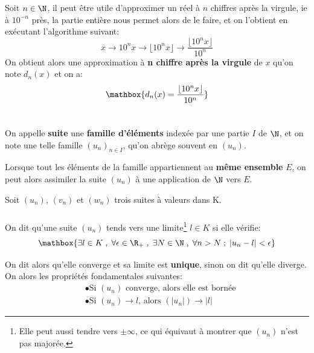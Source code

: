 \subsection*{}
Soit \(n \in \N\), il peut être utile d'approximer un réel à \(n\) chiffres après la virgule, ie à \(10^{-n}\) près, la partie entière nous permet alors de le faire, et on l'obtient en exécutant l'algorithme suivant:
\[
    x \longrightarrow 10^n x \longrightarrow \lfloor 10^n x \rfloor \longrightarrow \frac{\lfloor 10^n x \rfloor}{10^n}
\]
On obtient alors une approximation à \textbf{n chiffre après la virgule} de \(x\) qu'on note \(d_n(x)\) et on a:
\[
    \mathbox{
        d_n(x) = \frac{\lfloor 10^n x \rfloor}{10^n}
    }
\]

\chapter*{} %

On appelle \textbf{suite} une \textbf{famille d'éléments} indexée par une partie \(I\) de \(\N\), et on note une telle famille \((u_n)_{n \in I}\), qu'on abrège souvent en \((u_n)\).\<

Lorsque tout les éléments de la famille appartiennent au \textbf{même ensemble} \(E\), on peut alors assimiler la suite \((u_n)\) à une application de \(\N\) vers \(E\).\<

Soit \((u_n)\), \((v_n)\) et \((w_n)\) trois suites à valeurs dans K.

\subsection*{}
On dit qu'une suite \((u_n)\) tends vers une limite\footnote[1]{Elle peut aussi tendre vers \(\pm \infty\), ce qui équivaut à montrer que \((u_n)\) n'est pas majorée.} \(l \in K\) si elle vérifie:
\[
    \mathbox{
        \exists l \in K \; , \; \forall \epsilon \in \R_+ \; , \; \exists N \in \N \; , \; \forall n > N \; ; \; |u_n - l| < \epsilon   
    }
\]

On dit alors qu'elle converge et sa limite est \textbf{unique}, sinon on dit qu'elle diverge.\+
On alors les propriétés fondamentales suivantes:
\begin{align*}
    &\bullet \text{Si \((u_n)\) converge, alors elle est bornée}\\
    &\bullet \text{Si \((u_n) \rightarrow l\), alors \((|u_n|) \rightarrow |l|\)}
\end{align*}

